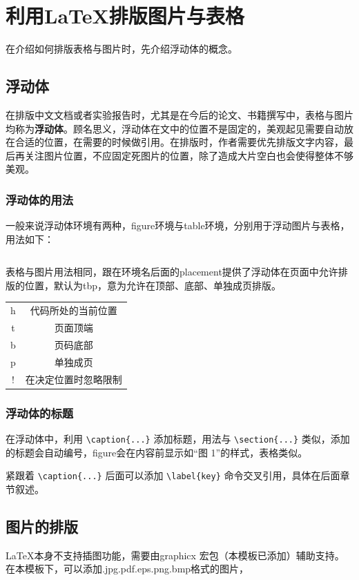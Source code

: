 \section{利用\LaTeX 排版图片与表格}
在介绍如何排版表格与图片时，先介绍浮动体的概念。
\subsection{浮动体}
在排版中文文档或者实验报告时，尤其是在今后的论文、书籍撰写中，表格与图片均称为\textbf{浮动体}。顾名思义，浮动体在文中的位置不是固定的，美观起见需要自动放在合适的位置，在需要的时候做引用。在排版时，作者需要优先排版文字内容，最后再关注图片位置，不应固定死图片的位置，除了造成大片空白也会使得整体不够美观。
\subsubsection{浮动体的用法}
一般来说浮动体环境有两种，figure环境与table环境，分别用于浮动图片与表格，用法如下：
\inputminted[linenos,frame=lines]{latex}{code/figure.tex}


表格与图片用法相同，跟在环境名后面的placement提供了浮动体在页面中允许排版的位置，默认为tbp，意为允许在顶部、底部、单独成页排版。
\begin{table}[h!]
\centering
\begin{tabular}{cc}
\hline
h&代码所处的当前位置\\
t&页面顶端\\
b&页码底部\\
p&单独成页\\
!&在决定位置时忽略限制\\
\hline
\end{tabular}
\end{table}
\subsubsection{浮动体的标题}
在浮动体中，利用 \verb|\caption{...}| 添加标题，用法与 \verb|\section{...}| 类似，添加的标题会自动编号，figure会在内容前显示如“图 1”的样式，表格类似。

紧跟着 \verb|\caption{...}| 后面可以添加 \verb|\label{key}| 命令交叉引用，具体在后面章节叙述。
\subsection{图片的排版}
\LaTeX 本身不支持插图功能，需要由graphicx 宏包（本模板已添加）辅助支持。在本模板下，可以添加.jpg.pdf.eps.png.bmp格式的图片，

